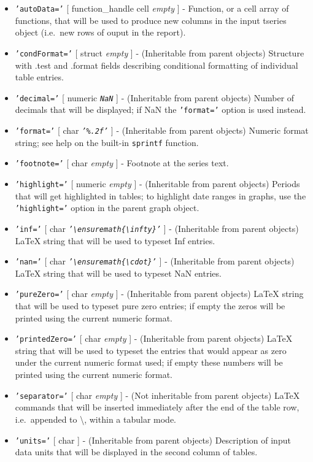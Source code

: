  \begin{itemize}
 \item
   \texttt{'autoData='} {[} function\_handle \textbar{} cell \textbar{}
   \emph{empty} {]} - Function, or a cell array of functions, that will
   be used to produce new columns in the input tseries object (i.e.~new
   rows of ouput in the report).
 \item
   \texttt{'condFormat='} {[} struct \textbar{} \emph{empty} {]} -
   (Inheritable from parent objects) Structure with .test and .format
   fields describing conditional formatting of individual table entries.
 \item
   \texttt{'decimal='} {[} numeric \textbar{} \emph{\texttt{NaN}} {]} -
   (Inheritable from parent objects) Number of decimals that will be
   displayed; if NaN the \texttt{'format='} option is used instead.
 \item
   \texttt{'format='} {[} char \textbar{} \emph{\texttt{'\%.2f'}} {]} -
   (Inheritable from parent objects) Numeric format string; see help on
   the built-in \texttt{sprintf} function.
 \item
   \texttt{'footnote='} {[} char \textbar{} \emph{empty} {]} - Footnote
   at the series text.
 \item
   \texttt{'highlight='} {[} numeric \textbar{} \emph{empty} {]} -
   (Inheritable from parent objects) Periods that will get highlighted in
   tables; to highlight date ranges in graphs, use the
   \texttt{'highlight='} option in the parent graph object.
 \item
   \texttt{'inf='} {[} char \textbar{}
   \emph{\texttt{'\textbackslash{}ensuremath\{\textbackslash{}infty\}'}}
   {]} - (Inheritable from parent objects) LaTeX string that will be used
   to typeset Inf entries.
 \item
   \texttt{'nan='} {[} char \textbar{}
   \emph{\texttt{'\textbackslash{}ensuremath\{\textbackslash{}cdot\}'}}
   {]} - (Inheritable from parent objects) LaTeX string that will be used
   to typeset NaN entries.
 \item
   \texttt{'pureZero='} {[} char \textbar{} \emph{empty} {]} -
   (Inheritable from parent objects) LaTeX string that will be used to
   typeset pure zero entries; if empty the zeros will be printed using
   the current numeric format.
 \item
   \texttt{'printedZero='} {[} char \textbar{} \emph{empty} {]} -
   (Inheritable from parent objects) LaTeX string that will be used to
   typeset the entries that would appear as zero under the current
   numeric format used; if empty these numbers will be printed using the
   current numeric format.
 \item
   \texttt{'separator='} {[} char \textbar{} \emph{empty} {]} - (Not
   inheritable from parent objects) LaTeX commands that will be inserted
   immediately after the end of the table row, i.e.~appended to
   \textbackslash{}, within a tabular mode.
 \item
   \texttt{'units='} {[} char {]} - (Inheritable from parent objects)
   Description of input data units that will be displayed in the second
   column of tables.
 \end{itemize}
 
